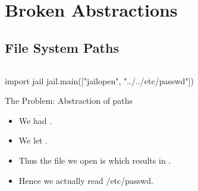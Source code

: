 \mode*




\section{Broken Abstractions}

\subsection{File System Paths}

\begin{frame}[fragile]
  \inputminted{python}{jail.py}
\end{frame}

\begin{frame}[fragile]
  \begin{example}
    \begin{pycode}
import jail
jail.main(["jailopen", "../../etc/passwd"])
    \end{pycode}
  \end{example}
\end{frame}

\begin{frame}
  \begin{alertblock}{The Problem: Abstraction of paths}
    \begin{itemize}
      \item We had .
      \item We let .
      \item Thus the file we open is  
        which results in .
      \item Hence we actually read /etc/passwd.
    \end{itemize}
  \end{alertblock}
\end{frame}

